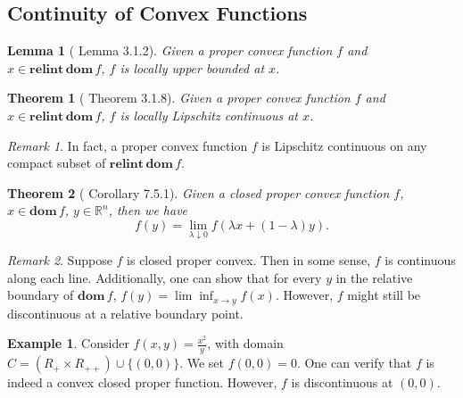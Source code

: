 \documentclass[openany]{book}
\newtheorem{lemma}{Lemma}[chapter]
\newtheorem{theorem}{Theorem}[chapter]
\theoremstyle{definition}
\newtheorem{example}{Example}[chapter]
\theoremstyle{remark}
\newtheorem*{remark}{Remark}
\begin{document}
\subsection{Continuity of Convex Functions}
\begin{lemma}[\cite{N13} Lemma 3.1.2]
    Given a proper convex function $f$ and $x\in \mathbf{relint}\,\mathbf{dom}\,f$, $f$ is locally upper bounded at $x$.
\end{lemma}
\begin{theorem}[\cite{N13} Theorem 3.1.8]\label{thm:localLipschitzConv}
    Given a proper convex function $f$ and $x\in \mathbf{relint}\,\mathbf{dom}\,f$, $f$ is locally Lipschitz continuous at $x$.
\end{theorem}
\begin{remark}
    In fact, a proper convex function $f$ is Lipschitz continuous on any compact subset of $\mathbf{relint}\,\mathbf{dom}\,f$.
\end{remark}
\begin{theorem}[\cite{R15} Corollary 7.5.1]\label{thm:closedConvLinCont}
    Given a closed proper convex function $f$, $x\in \mathbf{dom}\,f$, $y\in \mathbb{R}^n$, then we have
    \begin{equation*}
        f(y)=\lim_{\lambda\downarrow0}f(\lambda x+(1-\lambda)y).
    \end{equation*}
\end{theorem}
\begin{remark}
    Suppose $f$ is closed proper convex. Then in some sense, $f$ is continuous along each line. Additionally, one can show that for every $y$ in the relative boundary of $\mathbf{dom}\,f$, $f(y)=\lim\inf_{x\to y}f(x)$. However, $f$ might still be discontinuous at a relative boundary point.
\end{remark}
\begin{example}\label{ConvClosedPropNotCont}
    Consider $f(x,y)=\frac{x^2}{y}$, with domain $C=(R_+\times R_{++})\cup\{(0,0)\}$. We set $f(0,0)=0$. One can verify that $f$ is indeed a convex closed proper function. However, $f$ is discontinuous at $(0,0)$.
\end{example}
\end{document}
